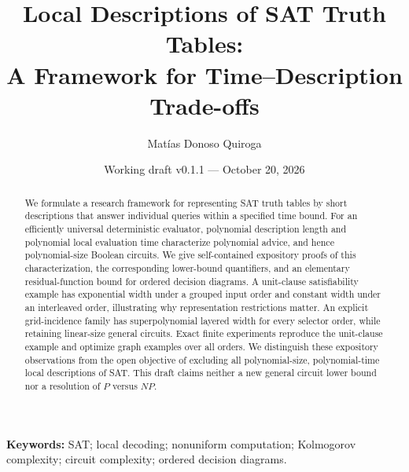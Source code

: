 \documentclass[11pt,a4paper]{article}
\title{Local Descriptions of SAT Truth Tables:\\
A Framework for Time--Description Trade-offs}
\author{Matías Donoso Quiroga}
\date{Working draft v0.1.1 --- October 20, 2026}
\begin{document}
\maketitle
\begin{abstract}
We formulate a research framework for representing SAT truth tables by short
descriptions that answer individual queries within a specified time bound.
For an efficiently universal deterministic evaluator, polynomial description
length and polynomial local evaluation time characterize polynomial advice,
and hence polynomial-size Boolean circuits. We give self-contained expository
proofs of this characterization, the corresponding lower-bound quantifiers,
and an elementary residual-function bound for ordered decision diagrams.
A unit-clause satisfiability example has exponential width under a grouped
input order and constant width under an interleaved order, illustrating why
representation restrictions matter. An explicit grid-incidence family has
superpolynomial layered width for every selector order, while retaining
linear-size general circuits. Exact finite experiments reproduce the unit-clause
example and optimize graph examples over all orders. We distinguish these
expository observations from the
open objective of excluding all polynomial-size, polynomial-time local
descriptions of SAT. This draft claims neither a new general circuit lower
bound nor a resolution of \(P\) versus \(NP\).
\end{abstract}
\noindent\textbf{Keywords:} SAT; local decoding; nonuniform computation;
Kolmogorov complexity; circuit complexity; ordered decision diagrams.









\begingroup
\small


\endgroup
\end{document}
